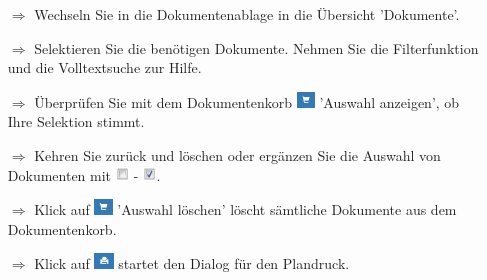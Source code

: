 \documentclass{article}
\begin{document}
\begin{multicols}{2}

\begin{tcolorbox}[colback=blue!5,colframe=blue!40!black,title=Dokumente für den Plandruck selektieren]
\begin{itemize}
  \item[$\Longrightarrow$] Wechseln Sie in die Dokumentenablage in die Übersicht 'Dokumente'. 
  \item[$\Longrightarrow$] Selektieren Sie die benötigen Dokumente. Nehmen Sie die Filterfunktion und die Volltextsuche zur Hilfe.
  \item[$\Longrightarrow$] Überprüfen Sie mit dem Dokumentenkorb \includegraphics[height=12pt]{Icons/dk_korb_b.jpg} 'Auswahl anzeigen', ob Ihre Selektion stimmt.
  \item[$\Longrightarrow$] Kehren Sie zurück und löschen oder ergänzen Sie die Auswahl von Dokumenten mit \includegraphics[height=10pt]{Icons/checkbox_leer.jpg} - \includegraphics[height=10pt]{Icons/checkbox_markiert.jpg}.
	\item[$\Longrightarrow$] Klick auf \includegraphics[height=12pt]{Icons/dk_korb_b.jpg} 'Auswahl löschen' löscht sämtliche Dokumente aus dem Dokumentenkorb.
	\item[$\Longrightarrow$] Klick auf \includegraphics[height=12pt]{Icons/dk_drucken.jpg} startet den Dialog für den Plandruck.
\end{itemize}
\end{tcolorbox}



\end{multicols}
\end{document}

